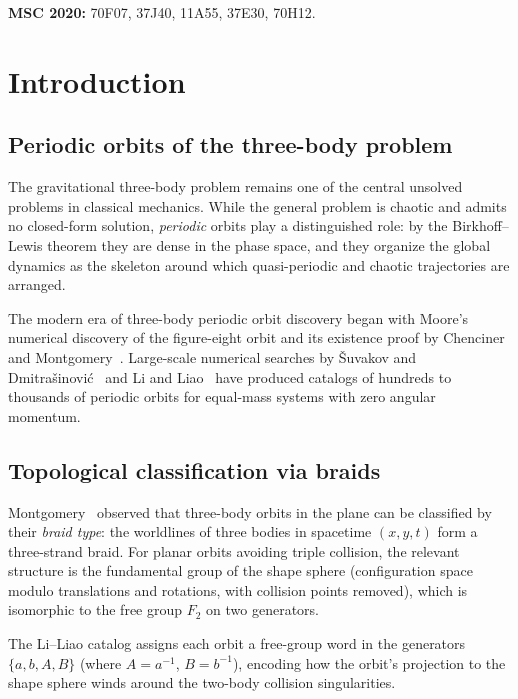\documentclass[11pt]{article}
\theoremstyle{definition}
\begin{document}
\noindent\textbf{MSC 2020:} 70F07, 37J40, 11A55, 37E30, 70H12.

\section{Introduction}\label{sec:intro}

\subsection{Periodic orbits of the three-body problem}

The gravitational three-body problem remains one of the central
unsolved problems in classical mechanics. While the general problem
is chaotic and admits no closed-form solution, \emph{periodic}
orbits play a distinguished role: by the Birkhoff--Lewis theorem
they are dense in the phase space, and they organize the global
dynamics as the skeleton around which quasi-periodic and chaotic
trajectories are arranged.

The modern era of three-body periodic orbit discovery began with
Moore's~\cite{Moore1993} numerical discovery of the figure-eight
orbit and its existence proof by Chenciner and
Montgomery~\cite{ChencinerMontgomery2000}. Large-scale numerical
searches by \v{S}uvakov and Dmitra\v{s}inovi\'{c}~\cite{Suvakov2013}
and Li and Liao~\cite{LiLiao2017, LiLiao2019} have produced catalogs
of hundreds to thousands of periodic orbits for equal-mass systems
with zero angular momentum.

\subsection{Topological classification via braids}

Montgomery~\cite{Montgomery1998} observed that three-body orbits in
the plane can be classified by their \emph{braid type}: the
worldlines of three bodies in spacetime $(x, y, t)$ form a
three-strand braid. For planar orbits avoiding triple collision, the
relevant structure is the fundamental group of the shape sphere
(configuration space modulo translations and rotations, with collision
points removed), which is isomorphic to the free group $F_2$ on two
generators.

The Li--Liao catalog assigns each orbit a free-group word in the
generators $\{a, b, A, B\}$ (where $A = a^{-1}$, $B = b^{-1}$),
encoding how the orbit's projection to the shape sphere winds
around the two-body collision singularities.
\end{document}

